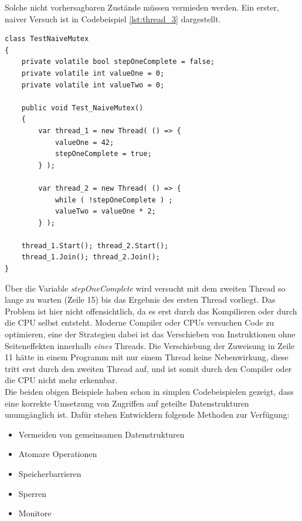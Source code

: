 Solche nicht vorhersagbaren Zustände müssen vermieden werden. Ein erster, naiver Versuch ist in Codebeispiel \ref{lst:thread_3} dargestellt.\parencite[S. 180]{Dahlin2012}
\begin{lstlisting}[caption={Thread naiver Mutex},label={lst:thread_3},captionpos=b]
class TestNaiveMutex
{
    private volatile bool stepOneComplete = false;
	private volatile int valueOne = 0;
	private volatile int valueTwo = 0;

	public void Test_NaiveMutex()
	{
		var thread_1 = new Thread( () => {
			valueOne = 42;
			stepOneComplete = true;
		} );

		var thread_2 = new Thread( () => {
			while ( !stepOneComplete ) ;
			valueTwo = valueOne * 2;
		} );

	thread_1.Start(); thread_2.Start();
	thread_1.Join(); thread_2.Join();
}
\end{lstlisting}
Über die Variable \textit{stepOneComplete} wird versucht mit dem zweiten Thread so lange zu warten (Zeile 15) bis das Ergebnis des ersten Thread vorliegt. Das Problem ist hier nicht offensichtlich, da es erst durch das Kompilieren oder durch die CPU selbst entsteht. Moderne Compiler oder CPUs versuchen Code zu optimieren, eine der Strategien dabei ist das Verschieben von Instruktionen ohne Seiteneffekten innerhalb \textit{eines} Threads\parencite[S. 100]{ecma335}. Die Verschiebung der Zuweisung in Zeile 11 hätte in einem Programm mit nur einem Thread keine Nebenwirkung, diese tritt erst durch den zweiten Thread auf, und ist somit durch den Compiler oder die CPU nicht mehr erkennbar.
\\Die beiden obigen Beispiele haben schon in simplen Codebeispielen gezeigt, dass eine korrekte Umsetzung von Zugriffen auf geteilte Datenstrukturen unumgänglich ist. Dafür stehen Entwicklern folgende Methoden zur Verfügung\parencite[S. 170ff]{tanenbaum2016}:
\begin{itemize}
	\item Vermeiden von gemeinsamen Datenstrukturen
	\item Atomare Operationen
	\item Speicherbarrieren
	\item Sperren
	\item Monitore
\end{itemize}

